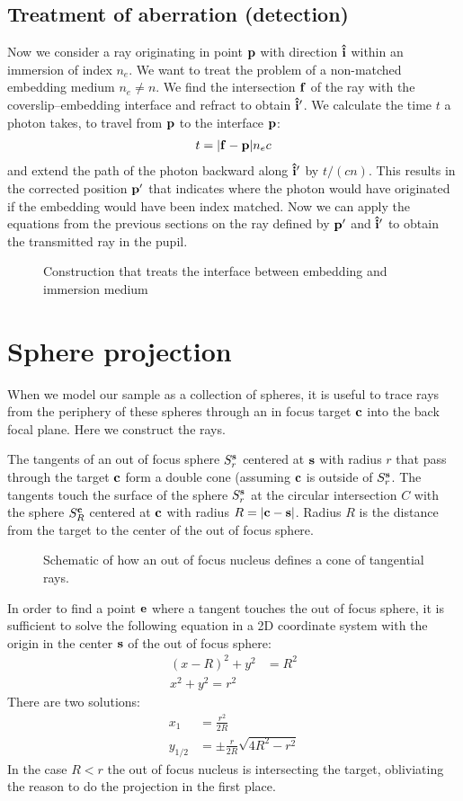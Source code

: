 \subsection{Treatment of aberration (detection)}
\label{sec:ray-aberration}
Now we consider a ray originating in point $\mathbf{p}$ with direction $\mathbf{\hat{i}}$
within an immersion of index $n_e$. We want to treat the problem of a
non-matched embedding medium $n_e\not=n$. We find the intersection
$\mathbf{f}$ of the ray with the coverslip--embedding interface and refract to
obtain $\mathbf{\hat{i}}'$. We calculate the time $t$ a photon takes, to travel from
$\mathbf{p}$ to the interface $\mathbf{p}$:
\begin{align}
  t = \mathopen| \mathbf{f} - \mathbf{p} \mathclose| n_e c
\end{align}
and extend the path of the photon backward along $\mathbf{\hat{i}}'$ by
$t/(cn)$. This results in the corrected position $\mathbf{p}'$ that indicates
where the photon would have originated if the embedding would have
been index matched.  Now we can apply the equations from the previous
sections on the ray defined by $\mathbf{p}'$ and $\mathbf{\hat{i}}'$ to obtain the
transmitted ray in the pupil.

 \begin{figure}[!hbt]
   \centering
   
   \caption{Construction that treats the interface between embedding
     and immersion medium}
 \end{figure}
\section{Sphere projection}
When we model our sample as a collection of spheres, it is useful to
trace rays from the periphery of these spheres through an in focus
target $\mathbf{c}$ into the back focal plane. Here we construct the rays.

The tangents of an out of focus sphere $S^{\mathbf{s}}_r$ centered at $\mathbf{s}$ with
radius $r$ that pass through the target $\mathbf{c}$ form a double cone
(assuming $\mathbf{c}$ is outside of $S^{\mathbf{s}}_r$. The tangents touch the surface
of the sphere $S^{\mathbf{s}}_r$ at the circular intersection $C$ with the sphere
$S^{\mathbf{c}}_R$ centered at $\mathbf{c}$ with radius $R=\mathopen| \mathbf{c}-\mathbf{s} \mathclose|$. Radius $R$ is
the distance from the target to the center of the out of focus sphere.
\begin{figure}[!hbt]
  \centering
  
  \caption{Schematic of how an out of focus nucleus defines a cone of
    tangential rays.}
\end{figure}
In order to find a point $\mathbf{e}$ where a tangent touches the out of focus
sphere, it is sufficient to solve the following equation in a 2D
coordinate system with the origin in the center $\mathbf{s}$ of the out of
focus sphere:
\begin{align}
  (x-R)^2+y^2&=R^2\\
  x^2+y^2=r^2
\end{align}
There are two solutions:
\begin{align}
  x_1&=\frac{r^2}{2R}\label{eqn:x1}\\ 
  y_{1/2}&=\pm\frac{r}{2R}\sqrt{4R^2-r^2} \label{eqn:y1}
\end{align}
In the case $R<r$ the out of focus nucleus is intersecting the target,
obliviating the reason to do the projection in the first place.

